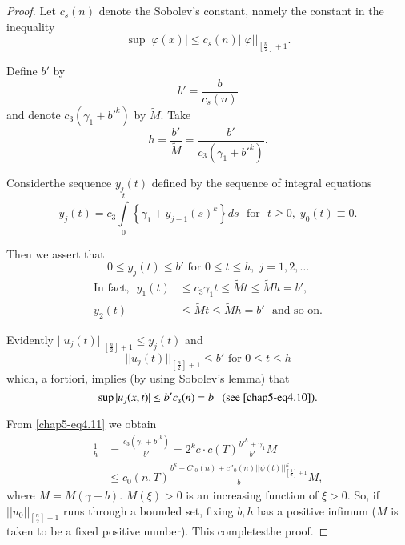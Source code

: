 \begin{proof}
Let $c_s(n)$ denote the Sobolev's constant, namely the constant in the
inequality  
$$
\sup |\varphi (x) |\leq c_s (n) || \varphi ||_{\left[\frac{n}{2}\right]+1}.  
$$

Define $b'$ by 
\begin{equation*}
b' = \frac{b} {c_s(n)}\tag{4.10}\label{chap5-eq4.10}
\end{equation*}
and denote $c_3 (\gamma_1 + b'^k)$ by $\tilde{M}$. Take  
\begin{equation}
h = \frac{b'}{\tilde{M}} = \frac{b'}{c_3 (\gamma_1 + {b'}^k
  )}.\tag{4.11}\label{chap5-eq4.11}  
\end{equation} 

Consider\pageoriginale the sequence $y_j (t)$ defined by the sequence
of integral equations   
$$
y_j (t) = c_3 \int\limits^t_0 \left\{\gamma_1 + y_{j-1}(s)^k
\right\}ds \text{~ for~ } t \geq  0, \; y_0 (t) \equiv 0. 
$$

Then we assert that 
$$
0 \leq y_j (t) \leq b' \text{ for } 0 \leq t \leq h, \; j = 1, 2, \ldots   
$$
\begin{align*}
\text{In fact,~ } y_1 (t) & \leq c_3 \gamma_1 t \leq \tilde{M} t \leq
\tilde{M} h = b',\\ 
y_2 (t) &\leq \tilde{M} t \leq \tilde{M} h = b' \text{~ and so on}.  
\end{align*}

Evidently $|| u_j (t)||_{\left[\frac{n}{2}\right]+1}\leq y_j (t)$ and 
\begin{equation*}
||u_j (t) ||_{\left[\frac{n}{2}\right]+1} \leq b' \text{ for } 0 \leq t \leq h
\tag{4.12}\label{chap5-eq4.12} 
\end{equation*}
which, a fortiori, implies (by using Sobolev's lemma) that 
$$
\sup |u_j (x, t) | \leq b' c_s (n) = b~~\text{ (see \eqref{chap5-eq4.10})}.  
$$

From \eqref{chap5-eq4.11} we obtain 
\begin{align*}
\frac{1}{h} & = \frac{c_3 (\gamma_1 + b'^k)}{b'} = 2^k c \cdot c (T)
\frac{{b'}^k + \gamma_1}{b'}M \\ 
& \leq c_0 (n, T) \frac{b^k + C'_0 (n) + c''_0(n) || \psi (t)
  ||^k_{\left[\frac{2}{n}\right]+1}}{b} M,  
\end{align*}
where $M = M (\gamma + b )$. $M (\xi)>0$ is an increasing function of
$\xi > 0$. So, if $||u_0||_{\left[\frac{n}{2} \right]+1}$ runs through a bounded
set, fixing $b, h$ has a positive infimum ($M$ is taken to be a fixed
positive number). This completes\pageoriginale the proof. 
\end{proof}

